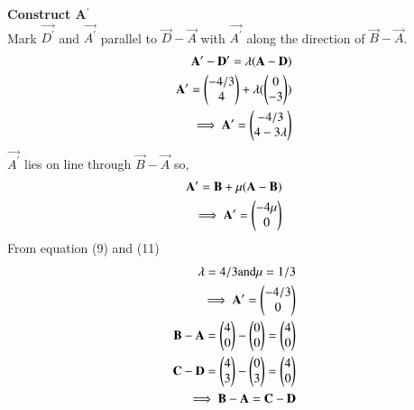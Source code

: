 \documentclass[journal]{IEEEtran}
\begin{document}
\textbf{Construct A$^{\prime}$}\\
Mark $\vec{D^{\prime}}$ and $\vec{A^{\prime}}$ parallel to $\vec{D}-\vec{A}$ with $\vec{A^{\prime}}$ along the direction of  $\vec{B}-\vec{A}$.\\
\begin{align}
\mathbf{A^{\prime}-D^{\prime}}=\lambda(\mathbf{A}-\mathbf{D})\\
\mathbf{A^{\prime}}=\begin{pmatrix}-4/3\\4\end{pmatrix}+\lambda(\begin{pmatrix}0\\-3\end{pmatrix})\\
\implies \mathbf{A^{\prime}}=\begin{pmatrix}-4/3\\4-3\lambda\end{pmatrix}
\end{align}
 $\vec{A^{\prime}}$ lies on line through $\vec{B}-\vec{A}$ so,
 \begin{align}
 \mathbf{A^{\prime}}=\mathbf{B}+\mu(\mathbf{A}-\mathbf{B})\\
 \implies \mathbf{A^{\prime}}=\begin{pmatrix}-4\mu\\0\end{pmatrix}\\
 \end{align}
 From equation (9) and (11)
 \begin{align}
 \lambda=4/3 \text{and} \mu=1/3\\
 \implies \vec{A^{\prime}}=\myvec{-4/3\\0}\\
    \Vec{B}-\Vec{A}=\myvec{4\\0}-\myvec{0\\0}=\myvec{4\\0}\\
    \Vec{C}-\Vec{D}=\myvec{4\\3}-\myvec{0\\3}=\myvec{4\\0}\\
\implies \Vec{B}-\Vec{A}=\Vec{C}-\Vec{D}
\end{align}
\end{document}

